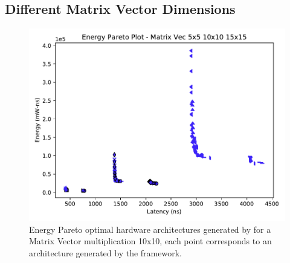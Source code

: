 \subsection{Different Matrix Vector Dimensions}
\begin{figure}[tb] 
\centering
\includegraphics[width=\columnwidth]{graphs/EnergyParetoPlotMultipleSizeMAtrixVec.pdf}
    \caption{\small Energy Pareto optimal hardware architectures generated by \frameworkname for a Matrix Vector multiplication 10x10, each point corresponds to an architecture generated by the framework.}
\label{fig:sram_vs_mram_pareto_vec_sizes}
\end{figure}


